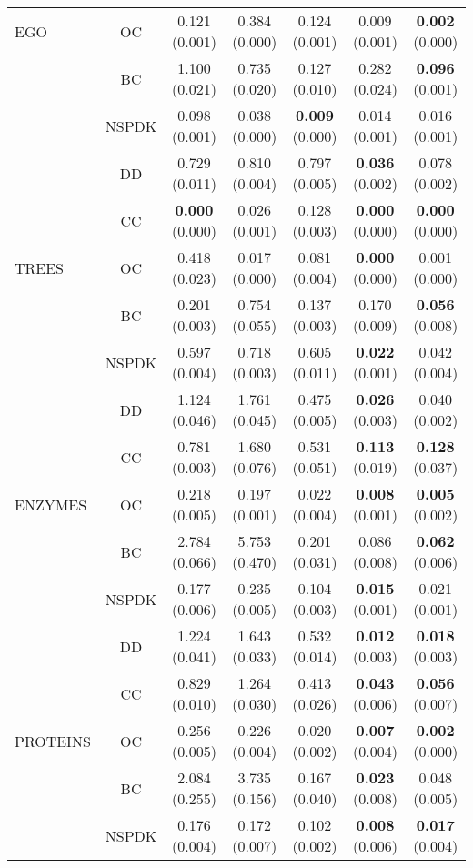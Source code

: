 \begin{table}[h!]
{\begin{tabular}{lcccccc}
EGO       & OC           & 0.121 (0.001) & 0.384 (0.000) & 0.124 (0.001) & 0.009 (0.001) & \textbf{0.002} (0.000)\\
          & BC           & 1.100 (0.021) & 0.735 (0.020) & 0.127 (0.010) & 0.282 (0.024) & \textbf{0.096} (0.001)\\
          & NSPDK        & 0.098 (0.001) & 0.038 (0.000) & \textbf{0.009} (0.000) & 0.014 (0.001) & 0.016 (0.001)\\
        \midrule
          & DD           & 0.729 (0.011) & 0.810 (0.004) & 0.797 (0.005) & \textbf{0.036} (0.002) & 0.078 (0.002)\\
          & CC           & \textbf{0.000} (0.000) & 0.026 (0.001) & 0.128 (0.003) & \textbf{0.000} (0.000) & \textbf{0.000} (0.000)\\
TREES     & OC           & 0.418 (0.023) & 0.017 (0.000) & 0.081 (0.004) & \textbf{0.000} (0.000) & 0.001 (0.000)\\
          & BC           & 0.201 (0.003) & 0.754 (0.055) & 0.137 (0.003) & 0.170 (0.009) & \textbf{0.056} (0.008)\\
          & NSPDK        & 0.597 (0.004) & 0.718 (0.003) & 0.605 (0.011) & \textbf{0.022} (0.001) & 0.042 (0.004)\\
        \midrule
          & DD           & 1.124 (0.046) & 1.761 (0.045) & 0.475 (0.005) & \textbf{0.026} (0.003) & 0.040 (0.002)\\
          & CC           & 0.781 (0.003) & 1.680 (0.076) & 0.531 (0.051) & \textbf{0.113} (0.019) & \textbf{0.128} (0.037)\\
ENZYMES   & OC           & 0.218 (0.005) & 0.197 (0.001) & 0.022 (0.004) & \textbf{0.008} (0.001) & \textbf{0.005} (0.002)\\
          & BC           & 2.784 (0.066) & 5.753 (0.470) & 0.201 (0.031) & 0.086 (0.008) & \textbf{0.062} (0.006)\\
          & NSPDK        & 0.177 (0.006) & 0.235 (0.005) & 0.104 (0.003) & \textbf{0.015} (0.001) & 0.021 (0.001)\\
        \midrule
          & DD           & 1.224 (0.041) & 1.643 (0.033) & 0.532 (0.014) & \textbf{0.012} (0.003) & \textbf{0.018} (0.003)\\
          & CC           & 0.829 (0.010) & 1.264 (0.030) & 0.413 (0.026) & \textbf{0.043} (0.006) & \textbf{0.056} (0.007)\\
PROTEINS  & OC           & 0.256 (0.005) & 0.226 (0.004) & 0.020 (0.002) & \textbf{0.007} (0.004) & \textbf{0.002} (0.000)\\
          & BC           & 2.084 (0.255) & 3.735 (0.156) & 0.167 (0.040) & \textbf{0.023} (0.008) & 0.048 (0.005)\\
          & NSPDK        & 0.176 (0.004) & 0.172 (0.007) & 0.102 (0.002) & \textbf{0.008} (0.006) & \textbf{0.017} (0.004)\\
        \bottomrule

    \end{tabular}}
\end{table}